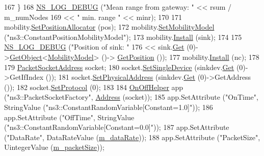 \begin{DoxyCode}
167       \}
168     \hyperlink{group__logging_ga413f1886406d49f59a6a0a89b77b4d0a}{NS\_LOG\_DEBUG} (\textcolor{stringliteral}{"Mean range from gateway: "} << rsum / m\_numNodes
169                                               << \textcolor{stringliteral}{"    min. range "} << minr);
170 
171     mobility.\hyperlink{classns3_1_1MobilityHelper_ac59d5295076be3cc11021566713a28c5}{SetPositionAllocator} (pos);
172     mobility.\hyperlink{classns3_1_1MobilityHelper_a030275011b6f40682e70534d30280aba}{SetMobilityModel} (\textcolor{stringliteral}{"ns3::ConstantPositionMobilityModel"});
173     mobility.\hyperlink{classns3_1_1MobilityHelper_a07737960ee95c0777109cf2994dd97ae}{Install} (sink);
174 
175     \hyperlink{group__logging_ga413f1886406d49f59a6a0a89b77b4d0a}{NS\_LOG\_DEBUG} (\textcolor{stringliteral}{"Position of sink: "}
176                   << sink.\hyperlink{classns3_1_1NodeContainer_a9ed96e2ecc22e0f5a3d4842eb9bf90bf}{Get} (0)->\hyperlink{classns3_1_1Object_a13e18c00017096c8381eb651d5bd0783}{GetObject}<\hyperlink{classns3_1_1MobilityModel}{MobilityModel}> ()->
      \hyperlink{lena-cqi-threshold_8cc_acebf763e1a0478cec225f9547941ae54}{GetPosition} ());
177     mobility.\hyperlink{classns3_1_1MobilityHelper_a07737960ee95c0777109cf2994dd97ae}{Install} (nc);
178 
179     \hyperlink{classns3_1_1PacketSocketAddress}{PacketSocketAddress} socket;
180     socket.\hyperlink{classns3_1_1PacketSocketAddress_ad1caa016f4d27c9d5f2c06dbfc53f8a3}{SetSingleDevice} (sinkdev.\hyperlink{classns3_1_1NetDeviceContainer_a677d62594b5c9d2dea155cc5045f4d0b}{Get} (0)->GetIfIndex ());
181     socket.\hyperlink{classns3_1_1PacketSocketAddress_a9452f9410a97e57344e464e25c2ab0f3}{SetPhysicalAddress} (sinkdev.\hyperlink{classns3_1_1NetDeviceContainer_a677d62594b5c9d2dea155cc5045f4d0b}{Get} (0)->GetAddress ());
182     socket.\hyperlink{classns3_1_1PacketSocketAddress_a9020962e39c238277f3b2f0de605647a}{SetProtocol} (0);
183 
184     \hyperlink{classns3_1_1OnOffHelper}{OnOffHelper} app (\textcolor{stringliteral}{"ns3::PacketSocketFactory"}, \hyperlink{classns3_1_1Address}{Address} (socket));
185     app.SetAttribute (\textcolor{stringliteral}{"OnTime"}, StringValue (\textcolor{stringliteral}{"ns3::ConstantRandomVariable[Constant=1.0]"}));
186     app.SetAttribute (\textcolor{stringliteral}{"OffTime"}, StringValue (\textcolor{stringliteral}{"ns3::ConstantRandomVariable[Constant=0.0]"}));
187     app.SetAttribute (\textcolor{stringliteral}{"DataRate"}, DataRateValue (\hyperlink{classNetAnimExperiment_a7998af435f1259ef914a8e434f76a0c0}{m\_dataRate}));
188     app.SetAttribute (\textcolor{stringliteral}{"PacketSize"}, UintegerValue (\hyperlink{classNetAnimExperiment_a8fa7c7d678fb0721374708aad5537510}{m\_packetSize}));

\end{DoxyCode}
